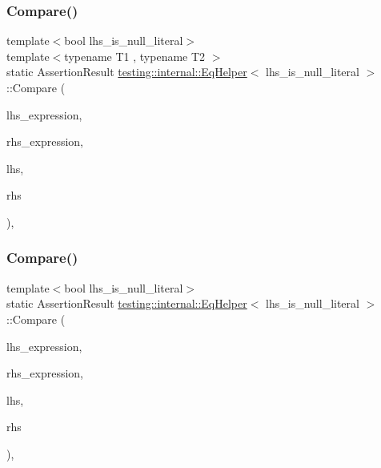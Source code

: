 \subsubsection{\texorpdfstring{Compare()}{Compare()}\hspace{0.1cm}{\footnotesize\ttfamily [1/8]}}
{\footnotesize\ttfamily template$<$bool lhs\+\_\+is\+\_\+null\+\_\+literal$>$ \\
template$<$typename T1 , typename T2 $>$ \\
static Assertion\+Result \mbox{\hyperlink{classtesting_1_1internal_1_1_eq_helper}{testing\+::internal\+::\+Eq\+Helper}}$<$ lhs\+\_\+is\+\_\+null\+\_\+literal $>$\+::Compare (\begin{DoxyParamCaption}\item[{const char $\ast$}]{lhs\+\_\+expression,  }\item[{const char $\ast$}]{rhs\+\_\+expression,  }\item[{const T1 \&}]{lhs,  }\item[{const T2 \&}]{rhs }\end{DoxyParamCaption})\hspace{0.3cm}{\ttfamily [inline]}, {\ttfamily [static]}}

\mbox{\label{classtesting_1_1internal_1_1_eq_helper_aaa42c0059bb3dcc43d556243febb5f1c}} 
\subsubsection{\texorpdfstring{Compare()}{Compare()}\hspace{0.1cm}{\footnotesize\ttfamily [2/8]}}
{\footnotesize\ttfamily template$<$bool lhs\+\_\+is\+\_\+null\+\_\+literal$>$ \\
static Assertion\+Result \mbox{\hyperlink{classtesting_1_1internal_1_1_eq_helper}{testing\+::internal\+::\+Eq\+Helper}}$<$ lhs\+\_\+is\+\_\+null\+\_\+literal $>$\+::Compare (\begin{DoxyParamCaption}\item[{const char $\ast$}]{lhs\+\_\+expression,  }\item[{const char $\ast$}]{rhs\+\_\+expression,  }\item[{\mbox{\hyperlink{namespacetesting_1_1internal_a05c6bd9ede5ccdf25191a590d610dcc6}{Biggest\+Int}}}]{lhs,  }\item[{\mbox{\hyperlink{namespacetesting_1_1internal_a05c6bd9ede5ccdf25191a590d610dcc6}{Biggest\+Int}}}]{rhs }\end{DoxyParamCaption})\hspace{0.3cm}{\ttfamily [inline]}, {\ttfamily [static]}}

